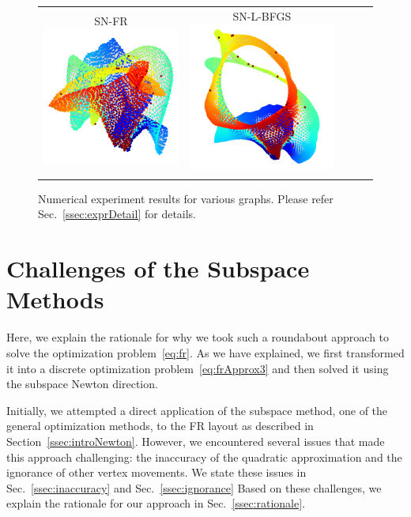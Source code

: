 \documentclass[dvipdfmx,journal]{IEEEtran}
\begin{document}
\begin{figure}[btp]
\begin{tabular}{ccccc}
        \makecell{\small{\textsf{SN-FR}}                                                                                \\[-0.2em]\includegraphics[width=0.27\columnwidth]{individual/viz/3elt_SN_FR.pdf}} &
        \makecell{\small{\textsf{SN-L-BFGS}}                                                                            \\[-0.2em]\includegraphics[width=0.27\columnwidth]{individual/viz/3elt_SN_L_BFGS.pdf}} \\
        \fi
    \end{tabular}
    \caption{Numerical experiment results for various graphs.  Please refer Sec.~\ref{ssec:exprDetail} for details.}
    \label{fig:individual}
\end{figure}

\section{Challenges of the Subspace Methods}\label{sec:challenges}

Here, we explain the rationale for why we took such a roundabout approach to solve the optimization problem~\eqref{eq:fr}.
As we have explained, we first transformed it into a discrete optimization problem~\eqref{eq:frApprox3} and then solved it using the subspace Newton direction.

Initially, we attempted a direct application of the subspace method, one of the general optimization methods, to the FR layout as described in Section~\ref{ssec:introNewton}.
However, we encountered several issues that made this approach challenging: the inaccuracy of the quadratic approximation and the ignorance of other vertex movements. We state these issues in Sec.~\ref{ssec:inaccuracy} and Sec.~\ref{ssec:ignorance}
Based on these challenges, we explain the rationale for our approach in Sec.~\ref{ssec:rationale}.
\end{document}
